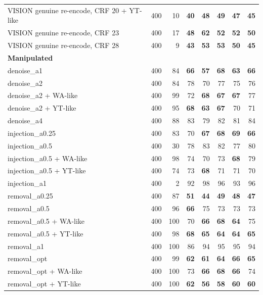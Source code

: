 \documentclass[11pt,a4paper]{article}
\begin{document}
{\begin{longtable}{p{7.2cm}rrrrrrr}
VISION genuine re-encode, CRF 20 + YT-like & 400 & 10 & \textbf{40} & \textbf{48} & \textbf{49} & \textbf{47} & \textbf{45} \\
VISION genuine re-encode, CRF 23 & 400 & 17 & \textbf{48} & \textbf{62} & \textbf{52} & \textbf{52} & \textbf{50} \\
VISION genuine re-encode, CRF 28 & 400 & 9 & \textbf{43} & \textbf{53} & \textbf{53} & \textbf{50} & \textbf{45} \\
\midrule\multicolumn{8}{l}{\textbf{Manipulated}} \\
denoise\_a1 & 400 & 84 & \textbf{66} & \textbf{57} & \textbf{68} & \textbf{63} & \textbf{66} \\
denoise\_a2 & 400 & 84 & 78 & 70 & 77 & 75 & 76 \\
denoise\_a2 + WA-like & 400 & 99 & 72 & \textbf{68} & \textbf{67} & \textbf{67} & 77 \\
denoise\_a2 + YT-like & 400 & 95 & \textbf{68} & \textbf{63} & \textbf{67} & 70 & 71 \\
denoise\_a4 & 400 & 88 & 83 & 79 & 82 & 81 & 84 \\
injection\_a0.25 & 400 & 83 & 70 & \textbf{67} & \textbf{68} & \textbf{69} & \textbf{66} \\
injection\_a0.5 & 400 & 30 & 78 & 83 & 82 & 77 & 80 \\
injection\_a0.5 + WA-like & 400 & 98 & 74 & 70 & 73 & \textbf{68} & 79 \\
injection\_a0.5 + YT-like & 400 & 74 & 73 & \textbf{68} & 71 & 71 & 70 \\
injection\_a1 & 400 & 2 & 92 & 98 & 96 & 93 & 96 \\
removal\_a0.25 & 400 & 87 & \textbf{51} & \textbf{44} & \textbf{49} & \textbf{48} & \textbf{47} \\
removal\_a0.5 & 400 & 96 & \textbf{66} & 75 & 73 & 73 & 73 \\
removal\_a0.5 + WA-like & 400 & 100 & 70 & \textbf{66} & \textbf{68} & \textbf{64} & 75 \\
removal\_a0.5 + YT-like & 400 & 98 & \textbf{68} & \textbf{65} & \textbf{64} & \textbf{64} & \textbf{65} \\
removal\_a1 & 400 & 100 & 86 & 94 & 95 & 95 & 94 \\
removal\_opt & 400 & 99 & \textbf{62} & \textbf{61} & \textbf{64} & \textbf{66} & \textbf{65} \\
removal\_opt + WA-like & 400 & 100 & 73 & \textbf{66} & \textbf{68} & \textbf{66} & 74 \\
removal\_opt + YT-like & 400 & 100 & \textbf{62} & \textbf{56} & \textbf{58} & \textbf{60} & \textbf{60} \\

\end{longtable}}
\end{document}

